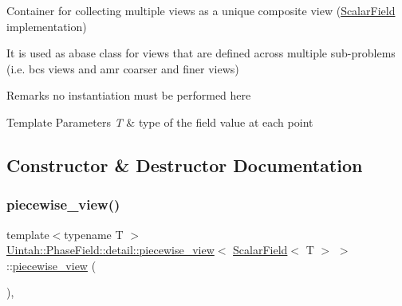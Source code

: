 Container for collecting multiple views as a unique composite view (\hyperlink{structUintah_1_1PhaseField_1_1ScalarField}{Scalar\+Field} implementation) 

It is used as abase class for views that are defined across multiple sub-\/problems (i.\+e. bcs views and amr coarser and finer views)

\begin{DoxyRemark}{Remarks}
no instantiation must be performed here
\end{DoxyRemark}

\begin{DoxyTemplParams}{Template Parameters}
{\em T} & type of the field value at each point \\
\hline
\end{DoxyTemplParams}


\subsection{Constructor \& Destructor Documentation}
\mbox{\label{classUintah_1_1PhaseField_1_1detail_1_1piecewise__view_3_01ScalarField_3_01T_01_4_01_4_a08150ac6e4892b7f07a5465ef5f4d0b6}} 
\subsubsection{\texorpdfstring{piecewise\+\_\+view()}{piecewise\_view()}\hspace{0.1cm}{\footnotesize\ttfamily [1/3]}}
{\footnotesize\ttfamily template$<$typename T $>$ \\
\hyperlink{classUintah_1_1PhaseField_1_1detail_1_1piecewise__view}{Uintah\+::\+Phase\+Field\+::detail\+::piecewise\+\_\+view}$<$ \hyperlink{structUintah_1_1PhaseField_1_1ScalarField}{Scalar\+Field}$<$ T $>$ $>$\+::\hyperlink{classUintah_1_1PhaseField_1_1detail_1_1piecewise__view}{piecewise\+\_\+view} (\begin{DoxyParamCaption}{ }\end{DoxyParamCaption})\hspace{0.3cm}{\ttfamily [protected]}, {\ttfamily [default]}}



